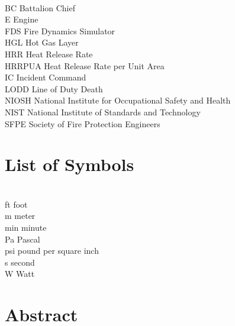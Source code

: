 \documentclass[12pt,oneside]{book}
\begin{document}
\begin{tabbing}
\hspace{1.5in} \= \\
BC \> Battalion Chief \\
E \> Engine \\
FDS \> Fire Dynamics Simulator \\
HGL \> Hot Gas Layer \\
HRR \> Heat Release Rate \\
HRRPUA \> Heat Release Rate per Unit Area \\
IC \> Incident Command \\
LODD \> Line of Duty Death \\
NIOSH \> National Institute for Occupational Safety and Health \\
NIST \> National Institute of Standards and Technology \\
SFPE \> Society of Fire Protection Engineers \\
\end{tabbing}

\chapter{List of Symbols}

\begin{tabbing}
\hspace{1.5in} \= \\
ft \> foot \\
m \> meter \\
min \> minute \\
Pa \> Pascal \\
psi \> pound per square inch \\
s \> second \\
W \> Watt \\
\end{tabbing}

\mainmatter


\chapter*{\centering Abstract}
\end{document}
